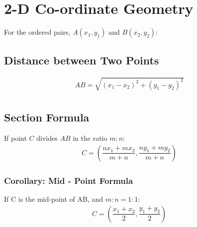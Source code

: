 \documentclass[../main.tex]{subfile}
\begin{document}
	\chapter{2-D Co-ordinate Geometry}
	For the ordered pairs, $A(x_1,y_1)$ and $B(x_2,y_2)$:
	\section{Distance between Two Points}
	\begin{align}
		AB = \sqrt{ (x_1-x_2)^2 + (y_1-y_2)^2 }\\
	\end{align}

	\section{Section Formula}
	If point $C$ divides $AB$ in the ratio $m:n$:
	\begin{align}
		C = \left( \dfrac{nx_1+mx_2}{m+n} , \dfrac{ny_1+my_2}{m+n} \right)
	\end{align}

	\subsection{Corollary: Mid - Point Formula}
	If C is the mid-point of AB, and $ m:n = 1:1$:
	\begin{align}
		C = \left( \dfrac{x_1+x_2}{2},\dfrac{y_1+y_2}{2} \right)\\
	\end{align}
\end{document}
